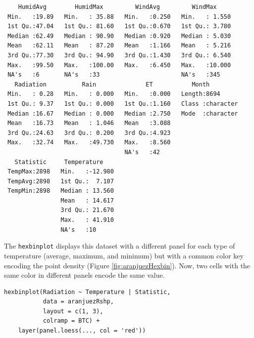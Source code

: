 \begin{verbatim}
    HumidAvg        HumidMax         WindAvg         WindMax      
 Min.   :19.89   Min.   : 35.88   Min.   :0.250   Min.   : 1.550  
 1st Qu.:47.04   1st Qu.: 81.60   1st Qu.:0.670   1st Qu.: 3.780  
 Median :62.49   Median : 90.90   Median :0.920   Median : 5.030  
 Mean   :62.11   Mean   : 87.20   Mean   :1.166   Mean   : 5.216  
 3rd Qu.:77.30   3rd Qu.: 94.90   3rd Qu.:1.430   3rd Qu.: 6.540  
 Max.   :99.50   Max.   :100.00   Max.   :6.450   Max.   :10.000  
 NA's   :6       NA's   :33                       NA's   :345     
   Radiation          Rain              ET           Month          
 Min.   : 0.28   Min.   : 0.000   Min.   :0.000   Length:8694       
 1st Qu.: 9.37   1st Qu.: 0.000   1st Qu.:1.160   Class :character  
 Median :16.67   Median : 0.000   Median :2.750   Mode  :character  
 Mean   :16.73   Mean   : 1.046   Mean   :3.088                     
 3rd Qu.:24.63   3rd Qu.: 0.200   3rd Qu.:4.923                     
 Max.   :32.74   Max.   :49.730   Max.   :8.560                     
                                  NA's   :42                        
   Statistic     Temperature     
 TempMax:2898   Min.   :-12.980  
 TempAvg:2898   1st Qu.:  7.107  
 TempMin:2898   Median : 13.560  
                Mean   : 14.617  
                3rd Qu.: 21.670  
                Max.   : 41.910  
                NA's   :10
\end{verbatim}

The \texttt{hexbinplot} displays this dataset with a different panel for
each type of temperature (average, maximum, and minimum) but with a
common color key encoding the point density (Figure
\ref{fig:aranjuezHexbin}). Now, two cells with the same color in
different panels encode the same value. 


\lstset{language=r,label= ,caption= ,captionpos=b,numbers=none}
\begin{lstlisting}
hexbinplot(Radiation ~ Temperature | Statistic,
           data = aranjuezRshp,
           layout = c(1, 3),
           colramp = BTC) +
    layer(panel.loess(..., col = 'red'))
\end{lstlisting}

